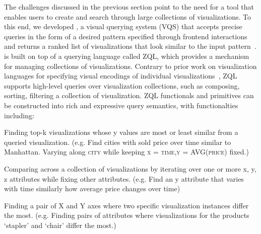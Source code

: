 \par The challenges discussed in the previous section point to the need for a tool that enables users to create and search through large collections of visualizations. To this end, we developed \zv, a visual querying system (VQS) that accepts precise queries in the form of a desired pattern specified through frontend interactions and returns a ranked list of visualizations that look similar to the input pattern~\cite{Siddiqui2016}. \zv is built on top of a querying language called ZQL, which provides a mechanism for managing collections of visualizations. Contrary to prior work on visualization languages for specifying visual encodings of individual visualizations~\cite{Stolte2002,Wilkinson2005}, ZQL supports high-level queries over visualization collections, such as composing, sorting, filtering a collection of visualization. ZQL functionals and primitives can be constructed into rich and expressive query semantics, with functionalties including: 
\squishlist
	\item Finding top-k visualizations whose y values are most or least similar from a queried visualization. (e.g. Find cities with sold price over time similar to Manhattan. Varying along \textsc{city} while keeping \textsc{x = time,y = AVG(price)} fixed.) 
	\item Comparing across a collection of visualizations by iterating over one or more x, y, z attributes while fixing other attributes. (e.g. Find an y attribute that varies with time similarly how average price changes over time)
	\item Finding a pair of X and Y axes where two specific visualization instances differ the most. (e.g. Finding pairs of attributes where visualizations for the products `stapler' and `chair' differ the most.)
\squishend
{}

